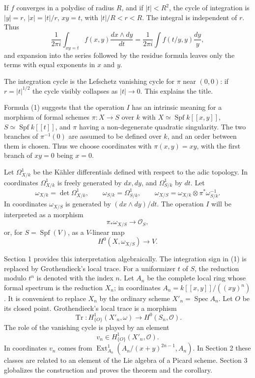 \documentclass[11pt]{article}
\theoremstyle{remark}
\DeclareMathOperator{\Spec}{Spec}
\DeclareMathOperator{\Spf}{Spf}
\DeclareMathOperator{\Ext}{Ext}
\newcommand{\OO}{\mathcal O}
\DeclareMathOperator{\Tr}{Tr}
\begin{document}
If $f$ converges in a polydisc of radius $R$, and if $|t|<R^2$, the cycle of integration is $|y|=r$, $|x|=|t|/r$, $xy=t$, with $|t|/R<r<R$. The integral is independent of $r$. Thus
\[
 \frac1{2\pi i}\int_{xy=t} f(x,y)\frac{dx\wedge dy}{dt}
 =\frac1{2\pi i}\int f(t/y,y)\frac{dy}{y},
\]
and expansion into the series followed by the residue formula leaves only the terms with equal exponents in $x$ and $y$.

The integration cycle is the Lefschetz vanishing cycle for $\pi$ near $(0,0)$: if $r=|t|^{1/2}$ the cycle visibly collapses as $|t|\to0$. This explains the title.

Formula (1) suggests that the operation $I$ has an intrinsic meaning for a morphism of formal schemes $\pi:X\to S$ over $k$ with $X\simeq\Spf k[[x,y]]$, $S\simeq\Spf k[[t]]$, and $\pi$ having a non-degenerate quadratic singularity. The two branches of $\pi^{-1}(0)$ are assumed to be defined over $k$, and an order between them is chosen. Thus we choose coordinates with $\pi(x,y)=xy$, with the first branch of $xy=0$ being $x=0$.

Let $\Omega^1_{X/k}$ be the Kähler differentials defined with respect to the adic topology. In coordinates $\Omega^1_{X/k}$ is freely generated by $dx,dy$, and $\Omega^1_{S/k}$ by $dt$. Let
\[
 \omega_{X/k}=\det\Omega^1_{X/k},\qquad
 \omega_{S/k}=\Omega^1_{S/k},\qquad
 \omega_{X/S}=\omega_{X/k}\otimes \pi^*\omega_{S/k}^{-1}.
\]
In coordinates $\omega_{X/S}$ is generated by $(dx\wedge dy)/dt$. The operation $I$ will be interpreted as a morphism
\[
 \pi_*\omega_{X/S}\longrightarrow\OO_S,
\]
or, for $S=\Spf(V)$, as a $V$-linear map
\[
 H^0(X,\omega_{X/S})\longrightarrow V.
\]

Section 1 provides this interpretation algebraically. The integration sign in (1) is replaced by Grothendieck's local trace. For a uniformizer $t$ of $S$, the reduction modulo $t^n$ is denoted with the index $n$. Let $A_n$ be the complete local ring whose formal spectrum is the reduction $X_n$; in coordinates $A_n=k[[x,y]]/((xy)^n)$. It is convenient to replace $X_n$ by the ordinary scheme $X'_n=\Spec A_n$. Let $O$ be its closed point. Grothendieck's local trace is a morphism
\[
 \Tr:H^1_{\{O\}}(X'_n,\omega)\longrightarrow H^0(S_n,\OO).
\]
The role of the vanishing cycle is played by an element
\[
 v_n\in H^1_{\{O\}}(X'_n,\OO).
\]
In coordinates $v_n$ comes from $\Ext^1_{A_n}(A_n/(x+y)^{2n-1},A_n)$. In Section 2 these classes are related to an element of the Lie algebra of a Picard scheme. Section 3 globalizes the construction and proves the theorem and the corollary.
\end{document}
